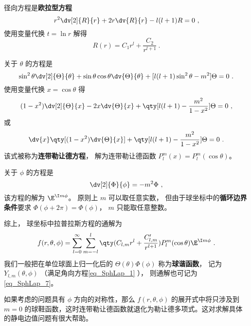 径向方程是\textbf{欧拉型方程}
\begin{equation}
r^2\dv[2]{R}{r} + 2r\dv{R}{r} - l(l+1)R = 0~,
\end{equation}
使用变量代换 $t = \ln r$ 解得
\begin{equation}
R(r) = C_1 r^l + \frac{C_2}{r^{l+1}}~.
\end{equation}

关于 $\theta$ 的方程是
\begin{equation}
\sin^2\theta \dv[2]{\Theta}{\theta} + \sin\theta\cos\theta\dv{\Theta}{\theta} + [l(l+1)\sin^2\theta - m^2] \Theta = 0~.
\end{equation}
使用变量代换 $x = \cos\theta$ 得
\begin{equation}
(1-x^2)\dv[2]{\Theta}{x} - 2x\dv{\Theta}{x} + \qty[l(l+1) - \frac{m^2}{1-x^2}]\Theta = 0~,
\end{equation}
或
\begin{equation}
\dv{x} \qty[(1-x^2)\dv{\Theta}{x}] + \qty[l(l+1) - \frac{m^2}{1-x^2}]\Theta = 0~.
\end{equation}
该式被称为\textbf{连带勒让德方程}， 解为连带勒让德函数 $P_l^m(x) = P_l^m(\cos\theta)$。

关于 $\phi$ 的方程是
\begin{equation}
\dv[2]{\Phi}{\phi} = -m^2 \Phi~,
\end{equation}
该方程的解为 $\E^{\I m\phi}$。 原则上 $m$ 可以取任意实数， 但由于球坐标中的\textbf{循环边界条件}要求 $\Phi(\phi + 2\pi) = \Phi(\phi)$， $m$ 只能取任意整数。

综上， 球坐标中拉普拉斯方程的通解为
\begin{equation}\label{eq_SphLap_6}
f(r, \theta, \phi) = \sum_{l = 0}^\infty \sum_{m = -l}^l \qty(C_{l,m} r^l + \frac{C'_{l,m}}{r^{l+1}})P_l^m(\cos\theta)\E^{\I m\phi}~.
\end{equation}
我们一般把在单位球面上归一化后的 $\Theta(\theta)\Phi(\phi)$ 称为\textbf{球谐函数}， 记为 $Y_{l,m}(\theta,\phi)$ （满足角向方程\autoref{eq_SphLap_1} ）， 则通解也可记为\autoref{eq_SphLap_7}。

如果考虑的问题具有 $\phi$ 方向的对称性，那么 $f(r,\theta,\phi)$ 的展开式中将只涉及到 $m=0$ 的球鞋函数，这时连带勒让德函数就退化为勒让德多项式。这对求解具体的静电边值问题有很大帮助。